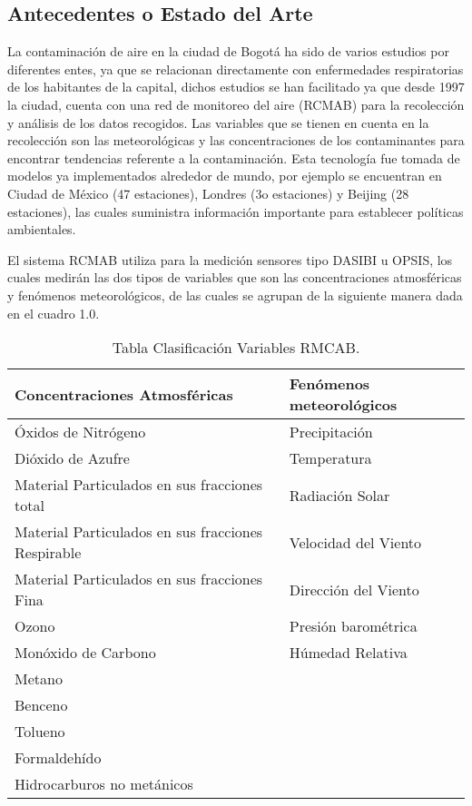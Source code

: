 \documentclass[a4paper, 11pt, oneside]{article}
\theoremstyle{definition}
\theoremstyle{remark}
\begin{document}
\subsection{Antecedentes o Estado del Arte}
La contaminación de aire en la ciudad de Bogotá ha sido de varios estudios por diferentes entes, ya que se relacionan directamente con enfermedades respiratorias de los habitantes de la capital, dichos estudios se han facilitado ya que desde 1997 la ciudad, cuenta con una red de monitoreo del aire (RCMAB) para la recolección y análisis de los datos recogidos. Las variables que se tienen en cuenta en la recolección son las meteorológicas y las concentraciones de los contaminantes para encontrar tendencias referente a la contaminación. Esta tecnología fue tomada de modelos ya implementados alrededor de mundo, por ejemplo se encuentran en Ciudad de México  (47 estaciones), Londres (3o estaciones) y Beijing (28 estaciones), las cuales suministra información importante para establecer políticas ambientales.

El sistema RCMAB utiliza para la medición sensores tipo DASIBI u OPSIS, los cuales medirán las dos tipos de variables que son las concentraciones atmosféricas y fenómenos meteorológicos, de las cuales se agrupan de la siguiente manera dada en el cuadro 1.0.

\begin{table}[htbp]
\begin{center}
\begin{tabular}{|l|l|}
\hline
Concentraciones Atmosféricas & Fenómenos  meteorológicos \\
\hline \hline
Óxidos de Nitrógeno & Precipitación \\ \hline
Dióxido de Azufre & Temperatura \\ \hline
Material Particulados en sus fracciones total & Radiación Solar \\ \hline
Material Particulados en sus fracciones Respirable & Velocidad del Viento \\ \hline
Material Particulados en sus fracciones Fina & Dirección del Viento \\ \hline
Ozono & Presión barométrica \\ \hline
Monóxido de Carbono & Húmedad Relativa \\ \hline
Metano &  \\ \hline
Benceno &  \\ \hline
Tolueno &  \\ \hline
Formaldehído &  \\ \hline
Hidrocarburos no metánicos & \\ \hline
\end{tabular}
\caption{Tabla Clasificación Variables RMCAB.}
\label{tabla:sencilla}
\end{center}
\end{table}
\end{document}
